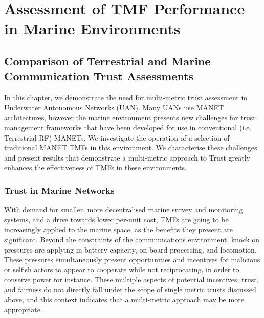 \def\ChapterTitle{Assessment of TMF Performance in Marine Environments}

\ifx\ifthesis\undefined

\else
\chapter{\ChapterTitle}
\label{Chapter\thechapter}
\fi



\section{Comparison of Terrestrial and Marine Communication Trust Assessments}

In this chapter, we demonstrate the need for multi-metric trust assessment in Underwater Autonomous Networks (UAN).
Many UANs use MANET architectures, however the marine environment presents new challenges for trust management frameworks that have been developed for use in conventional (i.e. Terrestrial RF) MANETs.
We investigate the operation of a selection of traditional MANET TMFs in this environment.
We characterise these challenges and present results that demonstrate a multi-metric approach to Trust greatly enhances the effectiveness of TMFs in these environments.

\subsection{Trust in Marine Networks}\label{sec:trust_in_marine}

With demand for smaller, more decentralised marine survey and monitoring systems, and a drive towards lower per-unit cost, TMFs are going to be increasingly applied to the marine space, as the benefits they present are significant.
Beyond the constraints of the communications environment, knock on pressures are applying in battery capacity, on-board processing, and locomotion.
These pressures simultaneously present opportunities and incentives for malicious or selfish actors to appear to cooperate while not reciprocating, in order to conserve power for instance.
These multiple aspects of potential incentives, trust, and fairness do not directly fall under the scope of single metric trusts discussed above, and this context indicates that a multi-metric approach may be more appropriate.

